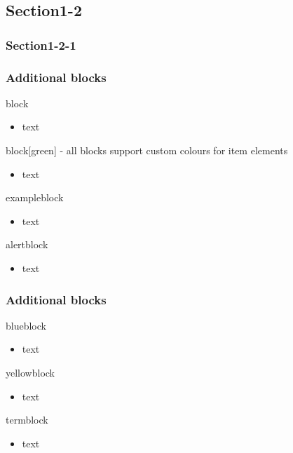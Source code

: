 \documentclass[t,compress,aspectratio=169]{beamer}
\begin{document}
\subsection{Section1-2}
\subsubsection{Section1-2-1}
\begin{frame}
\frametitle{Additional blocks}
\begin{block}{block}
\begin{itemize} \item text \end{itemize}
\end{block}
\begin{block}[green]{block[green] - all blocks support custom colours for item elements}
\begin{itemize} \item text \end{itemize}
\end{block}
\begin{exampleblock}{exampleblock}
\begin{itemize} \item text \end{itemize}
\end{exampleblock}
\begin{alertblock}{alertblock}
\begin{itemize} \item text \end{itemize}
\end{alertblock}
\end{frame}

\begin{frame}
\frametitle{Additional blocks}
\begin{blueblock}{blueblock}
\begin{itemize} \item text \end{itemize}
\end{blueblock}
\begin{yellowblock}{yellowblock}
\begin{itemize} \item text \end{itemize}
\end{yellowblock}
\begin{termblock}{termblock}
\begin{itemize} \item text \end{itemize}
\end{termblock}
\end{frame}
\end{document}
